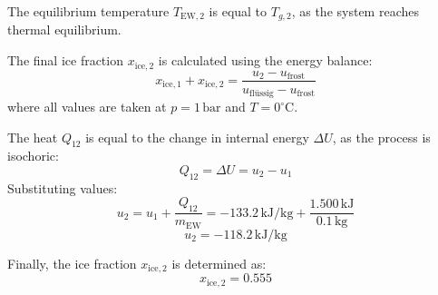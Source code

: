 The equilibrium temperature \( T_{\text{EW},2} \) is equal to \( T_{g,2} \), as the system reaches thermal equilibrium.  

The final ice fraction \( x_{\text{ice},2} \) is calculated using the energy balance:  
\[
x_{\text{ice},1} + x_{\text{ice},2} = \frac{u_2 - u_{\text{frost}}}{u_{\text{flüssig}} - u_{\text{frost}}}
\]  
where all values are taken at \( p = 1 \, \text{bar} \) and \( T = 0^\circ\text{C} \).  

The heat \( Q_{12} \) is equal to the change in internal energy \( \Delta U \), as the process is isochoric:  
\[
Q_{12} = \Delta U = u_2 - u_1
\]  
Substituting values:  
\[
u_2 = u_1 + \frac{Q_{12}}{m_{\text{EW}}} = -133.2 \, \text{kJ/kg} + \frac{1.500 \, \text{kJ}}{0.1 \, \text{kg}}
\]  
\[
u_2 = -118.2 \, \text{kJ/kg}
\]  

Finally, the ice fraction \( x_{\text{ice},2} \) is determined as:  
\[
x_{\text{ice},2} = 0.555
\]